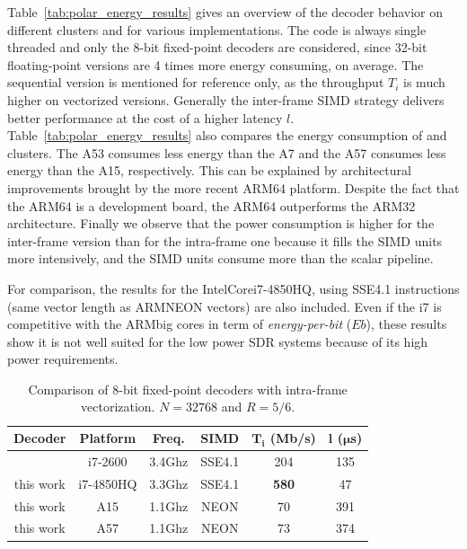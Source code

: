 Table~\ref{tab:polar_energy_results} gives an overview of the decoder behavior
on different clusters and for various implementations. The code is always single
threaded and only the 8-bit fixed-point decoders are considered, since 32-bit
floating-point versions  are 4 times more energy consuming, on average. The
sequential version is mentioned for reference only, as the  throughput $T_i$ is
much higher on vectorized versions. Generally the inter-frame SIMD strategy
delivers better performance at the cost of a higher latency $l$.
Table~\ref{tab:polar_energy_results} also compares the energy consumption of
\little and \big clusters. The A53 consumes less energy than the A7 and the A57
consumes less energy than the A15, respectively. This can be explained by
architectural improvements brought by the more recent ARM64 platform. Despite
the fact that the ARM64 is a development board, the ARM64 outperforms the ARM32
architecture. Finally we observe that the power consumption is higher for the
inter-frame version than for the intra-frame one because it fills the SIMD units
more intensively, and the SIMD units consume more than the scalar pipeline.

For comparison, the results for the Intel\R Core\TM i7-4850HQ, using SSE4.1
instructions (same vector length as ARM\R NEON vectors) are also included. Even
if the i7 is competitive with the ARM\R big cores in term of
\textit{energy-per-bit} ($E b$), these results show it is not well suited for
the low power SDR systems because of its high power requirements.

\begin{table}
  \caption{Comparison of 8-bit fixed-point decoders with intra-frame
    vectorization. $N = 32768$ and $R = 5/6$.}
  \label{tab:polar_energy_comparison}
  \begin{center}
  \begin{tabular}{c  c  c  c  c  c}
    \textbf{Decoder} &
    \textbf{Platform} &
    \textbf{Freq.} &
    \textbf{SIMD} &
    $\boldsymbol{T_i}$ \textbf{(Mb/s)} &
    $\boldsymbol{l}$   \textbf{($\boldsymbol{\mu}$s)}\\
    \hline
    \hline
    \cite{Giard2014} & i7-2600   & 3.4Ghz & SSE4.1 &         204  &  135 \\
    this work        & i7-4850HQ & 3.3Ghz & SSE4.1 & \textbf{580} &   47 \\
    this work        & A15       & 1.1Ghz & NEON   &          70  &  391 \\
    this work        & A57       & 1.1Ghz & NEON   &          73  &  374 \\
  \end{tabular}
  \end{center}
\end{table}

